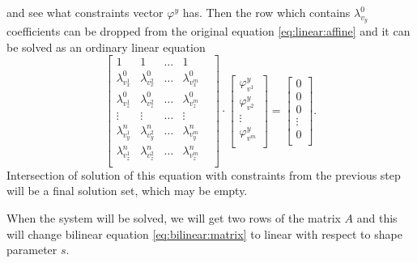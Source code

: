 and see what constraints vector $\varphi^y$ has.
Then the row which contains $\lambda^0_{v_y}$ coefficients
can be dropped from the original equation \eqref{eq:linear:affine}
and it can be solved as an ordinary linear equation
\begin{equation*}
  \begin{bmatrix}
    1                 & 1                 & \dots & 1                 & \\
    \lambda^0_{v^1_x} & \lambda^0_{v^2_x} & \dots & \lambda^0_{v^m_x} & \\
    \lambda^0_{v^1_z} & \lambda^0_{v^2_z} & \dots & \lambda^0_{v^m_z} & \\
    \vdots            & \vdots            & \dots & \vdots            & \\
    \lambda^n_{v^1_y} & \lambda^n_{v^2_y} & \dots & \lambda^n_{v^m_y} & \\
    \lambda^n_{v^1_z} & \lambda^n_{v^2_z} & \dots & \lambda^n_{v^m_z} & \\
  \end{bmatrix}
  \cdot
  \begin{bmatrix}
    \varphi^y_{v^1} \\
    \varphi^y_{v^2} \\
    \vdots          \\
    \varphi^y_{v^m} \\
  \end{bmatrix}
  =
  \begin{bmatrix}
    0       \\
    0       \\
    0       \\
    \vdots  \\
    0       \\
  \end{bmatrix}.
\end{equation*}
Intersection of solution of this equation
with constraints from the previous step
will be a final solution set, which may be empty.

When the system will be solved,
we will get two rows of the matrix $A$
and this will change bilinear equation \eqref{eq:bilinear:matrix}
to linear with respect to shape parameter $s$.

